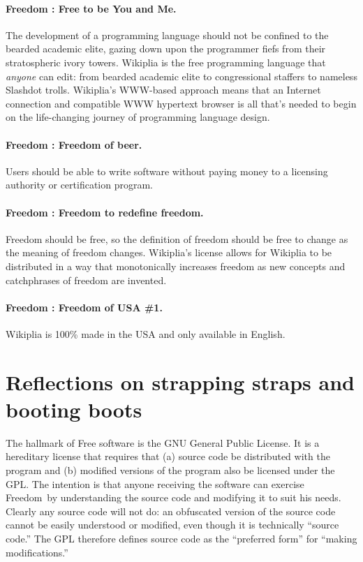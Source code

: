 \documentclass[twocolumn]{article}
\begin{document}
\paragraph{Freedom \ftobe: Free to be You and Me.}
The development of a programming language should not be confined to
the bearded academic elite, gazing down upon the programmer fiefs from
their stratospheric ivory towers. Wikiplia is the free programming
language that {\em anyone} can edit: from bearded academic
elite to congressional staffers to nameless Slashdot
trolls. Wikiplia's WWW-based approach means that an Internet
connection and compatible WWW hypertext browser is all that's needed
to begin on the life-changing journey of programming language design.


\paragraph{Freedom \fbeer: Freedom of beer.}
Users should be able to write software without paying money to a
licensing authority or certification program.

\paragraph{Freedom \ffree: Freedom to redefine freedom.}
Freedom should be free, so the definition of freedom should be free to
change as the meaning of freedom changes. Wikiplia's license allows
for Wikiplia to be distributed in a way that monotonically increases
freedom as new concepts and catchphrases of freedom are invented.

\paragraph{Freedom \fusa: Freedom of USA \#1.}
Wikiplia is 100\% made in the USA and only available in
English.\z{}


\section{Reflections on strapping straps and booting boots} \label{sec:bootstrap}

The hallmark of Free software is the GNU General Public License. It is
a hereditary license that requires that (a) source code be distributed
with the program and (b) modified versions of the program also be
licensed under the GPL. The intention is that anyone receiving the
software can exercise Freedom~\ftinker by understanding the source
code and modifying it to suit his needs. Clearly any source code will
not do: an obfuscated version of the source
code cannot be easily understood or modified, even though it is
technically ``source code.'' The GPL therefore defines source code as
the ``preferred form'' for ``making modifications.''
\end{document}
